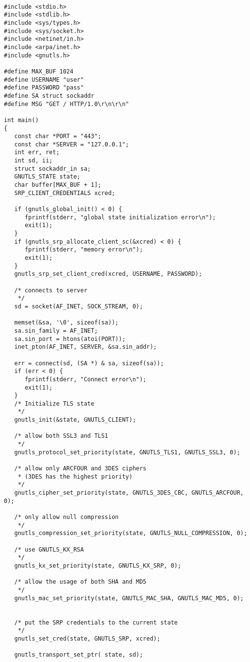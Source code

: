 \begin{verbatim}

#include <stdio.h>
#include <stdlib.h>
#include <sys/types.h>
#include <sys/socket.h>
#include <netinet/in.h>
#include <arpa/inet.h>
#include <gnutls.h>

#define MAX_BUF 1024
#define USERNAME "user"
#define PASSWORD "pass"
#define SA struct sockaddr
#define MSG "GET / HTTP/1.0\r\n\r\n"

int main()
{
   const char *PORT = "443";
   const char *SERVER = "127.0.0.1";
   int err, ret;
   int sd, ii;
   struct sockaddr_in sa;
   GNUTLS_STATE state;
   char buffer[MAX_BUF + 1];
   SRP_CLIENT_CREDENTIALS xcred;

   if (gnutls_global_init() < 0) {
      fprintf(stderr, "global state initialization error\n");
      exit(1);
   }
   if (gnutls_srp_allocate_client_sc(&xcred) < 0) {
      fprintf(stderr, "memory error\n");
      exit(1);
   }
   gnutls_srp_set_client_cred(xcred, USERNAME, PASSWORD);

   /* connects to server 
    */
   sd = socket(AF_INET, SOCK_STREAM, 0);

   memset(&sa, '\0', sizeof(sa));
   sa.sin_family = AF_INET;
   sa.sin_port = htons(atoi(PORT));
   inet_pton(AF_INET, SERVER, &sa.sin_addr);

   err = connect(sd, (SA *) & sa, sizeof(sa));
   if (err < 0) {
      fprintf(stderr, "Connect error\n");
      exit(1);
   }
   /* Initialize TLS state 
    */
   gnutls_init(&state, GNUTLS_CLIENT);

   /* allow both SSL3 and TLS1
    */
   gnutls_protocol_set_priority(state, GNUTLS_TLS1, GNUTLS_SSL3, 0);

   /* allow only ARCFOUR and 3DES ciphers
    * (3DES has the highest priority)
    */
   gnutls_cipher_set_priority(state, GNUTLS_3DES_CBC, GNUTLS_ARCFOUR, 0);

   /* only allow null compression
    */
   gnutls_compression_set_priority(state, GNUTLS_NULL_COMPRESSION, 0);

   /* use GNUTLS_KX_RSA
    */
   gnutls_kx_set_priority(state, GNUTLS_KX_SRP, 0);

   /* allow the usage of both SHA and MD5
    */
   gnutls_mac_set_priority(state, GNUTLS_MAC_SHA, GNUTLS_MAC_MD5, 0);


   /* put the SRP credentials to the current state
    */
   gnutls_set_cred(state, GNUTLS_SRP, xcred);

   gnutls_transport_set_ptr( state, sd);


\end{verbatim}
